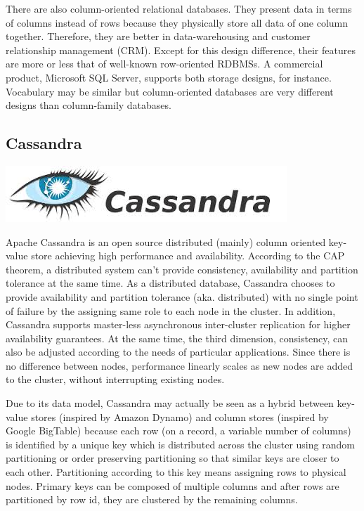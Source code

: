 There are also column-oriented relational databases. They present data in terms of columns instead of rows because they physically store all data of one column together. Therefore, they are better in data-warehousing and customer relationship management (CRM). Except for this design difference, their features are more or less that of well-known row-oriented RDBMSs. A commercial product, Microsoft SQL Server, supports both storage designs, for instance. Vocabulary may be similar but column-oriented databases are very different designs than column-family databases.

\subsection{Cassandra}

\vspace{-1.15cm} \hspace{3.5cm} \includegraphics[scale=0.4]{3/figures/cassandra.jpg}

Apache Cassandra\cite{cassandracite} is an open source distributed (mainly) column oriented key-value store achieving high performance and availability. According to the CAP theorem\cite{cap}, a distributed system can't provide consistency, availability and partition tolerance at the same time. As a distributed database, Cassandra chooses to provide availability and partition tolerance (aka. distributed) with no single point of failure by the assigning same role to each node in the cluster. In addition, Cassandra supports master-less asynchronous inter-cluster replication for higher availability guarantees. At the same time, the third dimension, consistency, can also be adjusted according to the needs of particular applications. Since there is no difference between nodes, performance linearly scales as new nodes are added to the cluster, without interrupting existing nodes.

Due to its data model, Cassandra may actually be seen as a hybrid between key-value stores (inspired by Amazon Dynamo\cite{dynamo}) and column stores (inspired by Google BigTable\cite{bigtable}) because each row (on a record, a variable number of columns) is identified by a unique key which is distributed across the cluster using random partitioning or order preserving partitioning so that similar keys are closer to each other. Partitioning according to this key means assigning rows to physical nodes. Primary keys can be composed of multiple columns and after rows are partitioned by row id, they are clustered by the remaining columns.


